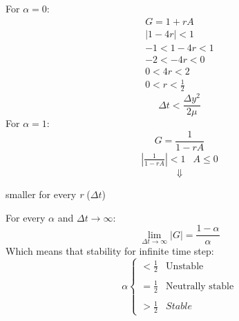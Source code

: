 \documentclass[11pt, a4paper]{article}
\begin{document}
For $\alpha = 0$:
\begin{align*}
        G = 1+rA\\
        \left|1-4r\right| < 1\\
        -1< 1-4r <1\\
        -2< -4r <0\\
        0< 4r <2\\
        0< r <\frac{1}{2}
\end{align*}
\begin{equation}
    \Delta t < \frac{\Delta y^2}{2\mu}
    \label{eq45}
\end{equation}
For $\alpha = 1$:
\begin{equation*}
    G = \frac{1}{1-rA}
\end{equation*}
\begin{equation}
    \begin{matrix}
        \displaystyle\left|\frac{1}{1-rA}\right|<1 & A \leq 0
    \end{matrix}
\end{equation}
$$\Downarrow$$
\begin{center}
    smaller for every \emph{r} ($\Delta t$)
\end{center}
For every $\alpha$ and $\Delta t\rightarrow\infty$:
\begin{equation}
    \lim_{\Delta t\rightarrow\infty}\left|G\right|=\frac{1-\alpha}{\alpha}
\end{equation}
Which means that stability for infinite time step:
\begin{equation}
    \alpha \left\{\begin{matrix}
        \displaystyle<\frac{1}{2} & \text{Unstable} \\\\
        \displaystyle=\frac{1}{2} & \text{Neutrally stable} \\\\
        \displaystyle>\frac{1}{2} & Stable
    \end{matrix}\right.
\end{equation}



\newpage
\end{document}
